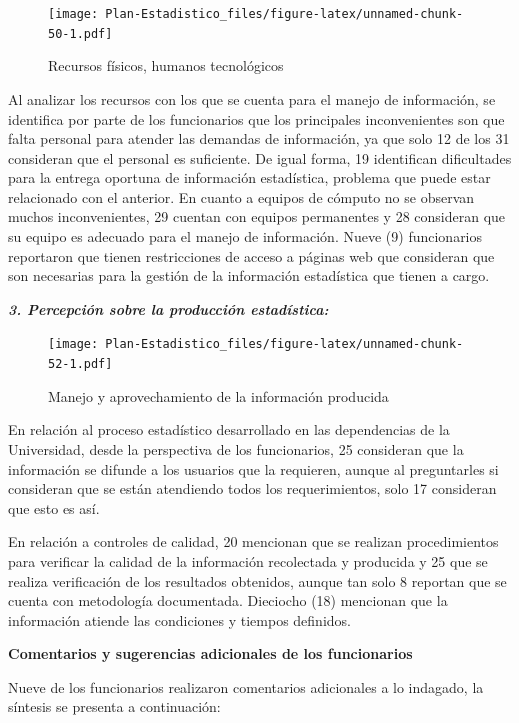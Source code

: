 \documentclass[
]{book}
\begin{document}
\begin{figure}
\centering
\texttt{[image: Plan-Estadistico\_files/figure-latex/unnamed-chunk-50-1.pdf]}
\caption{\label{fig:unnamed-chunk-50}Recursos físicos, humanos tecnológicos}
\end{figure}

Al analizar los recursos con los que se cuenta para el
manejo de información, se identifica por parte de los funcionarios que los principales inconvenientes son que falta personal para atender las demandas de
información, ya que solo 12 de los 31 consideran que el personal es suficiente. De igual forma, 19 identifican dificultades para la entrega oportuna de información estadística, problema que puede estar
relacionado con el anterior. En cuanto a equipos de cómputo no se observan muchos inconvenientes, 29 cuentan con equipos permanentes y 28 consideran que su equipo es adecuado para el manejo de información. Nueve (9) funcionarios reportaron que tienen restricciones de acceso a páginas web que consideran que son necesarias para la gestión de la información estadística que tienen a cargo.

\textbf{\emph{3. Percepción sobre la producción estadística:}}

\begin{figure}
\centering
\texttt{[image: Plan-Estadistico\_files/figure-latex/unnamed-chunk-52-1.pdf]}
\caption{\label{fig:unnamed-chunk-52}Manejo y aprovechamiento de la información producida}
\end{figure}

En relación al proceso estadístico desarrollado en las dependencias de la Universidad, desde la perspectiva de los funcionarios, 25 consideran que la información se difunde a los usuarios que la requieren, aunque al preguntarles si consideran que se están atendiendo todos los requerimientos, solo 17 consideran que esto es así.

En relación a controles de calidad, 20 mencionan que se realizan procedimientos para verificar la calidad de la información recolectada y producida y 25 que se realiza verificación de los resultados obtenidos, aunque tan solo 8 reportan que se cuenta con metodología documentada. Dieciocho (18) mencionan que la información atiende las condiciones y tiempos definidos.

\textbf{Comentarios y sugerencias adicionales de los funcionarios}

Nueve de los funcionarios realizaron comentarios adicionales a lo indagado, la síntesis se presenta a continuación:
\end{document}
